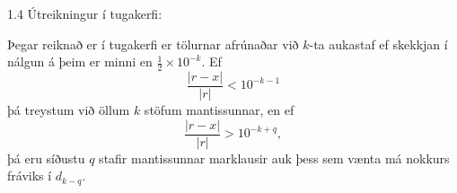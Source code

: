 \begin{frame}{1.4 Útreikningur í tugakerfi:} 

Þegar reiknað er í tugakerfi er tölurnar afrúnaðar við $k$-ta aukastaf
ef skekkjan í nálgun á þeim er minni en $\frac 12\times 10^{-k}$. Ef 
\begin{equation*}
    \dfrac{|r-x|}{|r|}<10^{-k-1}
\end{equation*}
þá treystum við öllum $k$ stöfum mantissunnar, en ef
\begin{equation*}
    \dfrac{|r-x|}{|r|}>10^{-k+q},
\end{equation*}
þá eru síðustu $q$ stafir mantissunnar marklausir auk þess
sem vænta má nokkurs fráviks í $d_{k-q}$.
\end{frame}




% 
% 
% 
% 
% 
% 
% 
% 

